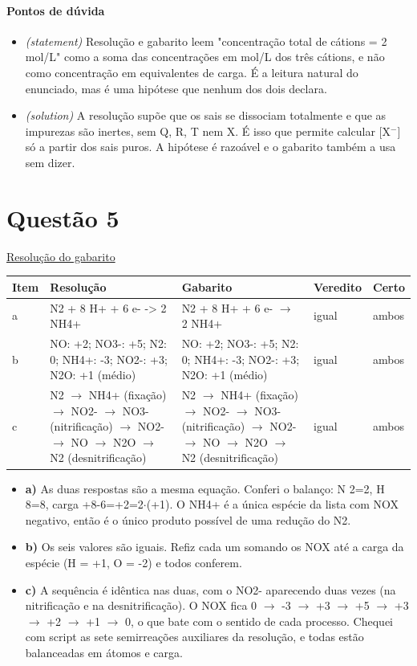 \documentclass{article}%
\begin{document}
\paragraph{Pontos de dúvida}%
\begin{itemize}%
\item%
\textit{(statement)} Resolução e gabarito leem "concentração total de cátions = 2 mol/L" como a soma das concentrações em mol/L dos três cátions, e não como concentração em equivalentes de carga. É a leitura natural do enunciado, mas é uma hipótese que nenhum dos dois declara.%
\item%
\textit{(solution)} A resolução supõe que os sais se dissociam totalmente e que as impurezas são inertes, sem Q, R, T nem X. É isso que permite calcular {[}X$^{-}${]} só a partir dos sais puros. A hipótese é razoável e o gabarito também a usa sem dizer.%
\end{itemize}%
\section*{Questão 5}%
\href{https://poliedroresolve.sistemapoliedro.com.br/vestibulares/ita/2027/ita-2-fase-dia-2-21-10-2026-2-fase-dia-2/dissertativa-5-quimica-2-fase-dia-2-ita-2027}{Resolução do gabarito}\par\smallskip%
\begin{longtable}{@{}p{} p{} p{} p{} p{}@{}}\toprule Item & Resolução & Gabarito & Veredito & Certo \\ \midrule
a & N2 + 8 H+ + 6 e{-} {-}> 2 NH4+ & N2 + 8 H+ + 6 e- $\to$ 2 NH4+ & igual & ambos \\
b & NO: +2; NO3{-}: +5; N2: 0; NH4+: {-}3; NO2{-}: +3; N2O: +1 (médio) & NO: +2; NO3-: +5; N2: 0; NH4+: -3; NO2-: +3; N2O: +1 (médio) & igual & ambos \\
c & N2 $\to$ NH4+ (fixação) $\to$ NO2- $\to$ NO3- (nitrificação) $\to$ NO2- $\to$ NO $\to$ N2O $\to$ N2 (desnitrificação) & N2 $\to$ NH4+ (fixação) $\to$ NO2- $\to$ NO3- (nitrificação) $\to$ NO2- $\to$ NO $\to$ N2O $\to$ N2 (desnitrificação) & igual & ambos \\
\bottomrule\end{longtable}%
\begin{itemize}%
\item%
\textbf{a)} As duas respostas são a mesma equação. Conferi o balanço: N 2=2, H 8=8, carga +8-6=+2=2$\cdot$(+1). O NH4+ é a única espécie da lista com NOX negativo, então é o único produto possível de uma redução do N2.%
\item%
\textbf{b)} Os seis valores são iguais. Refiz cada um somando os NOX até a carga da espécie (H = +1, O = -2) e todos conferem.%
\item%
\textbf{c)} A sequência é idêntica nas duas, com o NO2- aparecendo duas vezes (na nitrificação e na desnitrificação). O NOX fica 0 $\to$ -3 $\to$ +3 $\to$ +5 $\to$ +3 $\to$ +2 $\to$ +1 $\to$ 0, o que bate com o sentido de cada processo. Chequei com script as sete semirreações auxiliares da resolução, e todas estão balanceadas em átomos e carga.%
\end{itemize}%
\end{document}
